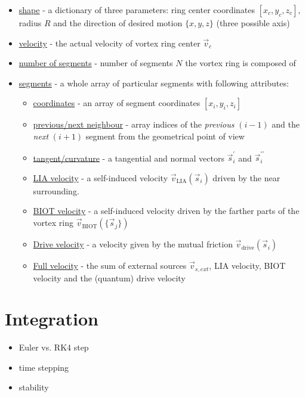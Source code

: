 \begin{itemize}
	\item \underline{shape} - a dictionary of three parameters: ring center coordinates $[x_c,y_c,z_c]$, radius $R$ and the direction of desired motion $\{x, y, z\}$ (three possible axis)
	\item \underline{velocity} - the actual velocity of vortex ring center $\vec{v}_c$
	\item \underline{number of segments} - number of segments $N$ the vortex ring is composed of
	\item \underline{segments} - a whole array of particular segments with following attributes:
	\begin{itemize}
		\item \underline{coordinates} - an array of segment coordinates $[x_i,y_i,z_i]$
		\item \underline{previous/next neighbour} - array indices of the \textit{previous} $(i-1)$ and the \textit{next} $(i+1)$ segment from the geometrical point of view
		\item \underline{tangent/curvature} - a tangential and normal vectors $\vec{s}^{\prime}_i$ and $\vec{s}^{\prime\prime}_i$

		\item \underline{LIA velocity} - a self-induced velocity $\vec{v}_{\text{LIA}}(\vec{s}_i)$ driven by the near surrounding.
		\item \underline{BIOT velocity} - a self-induced velocity driven by the farther parts of the vortex ring $\vec{v}_{\text{BIOT}}(\{\vec{s}_j\})$

		\item \underline{Drive velocity} - a velocity given by the mutual friction $\vec{v}_{\text{drive}}(\vec{s}_i)$
		\item \underline{Full velocity} - the sum of external sources $\vec{v}_{s,ext}$, LIA velocity, BIOT velocity and the (quantum) drive velocity
	\end{itemize}
\end{itemize}


\section{Integration}
\begin{itemize}
	\item Euler vs. RK4 step
	\item time stepping
	\item stability
\end{itemize}

